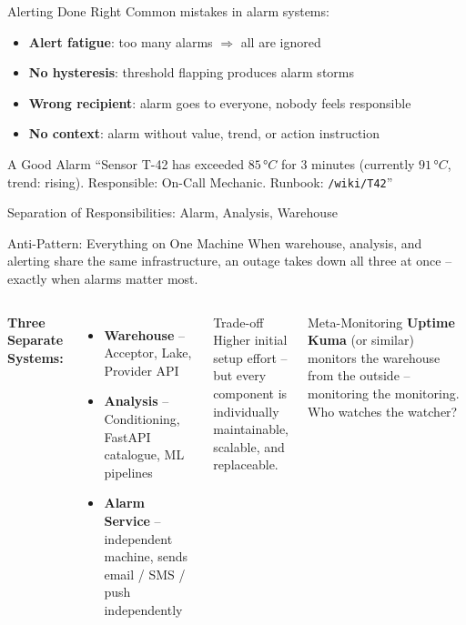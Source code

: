 \documentclass[aspectratio=169]{beamer}
\begin{document}
\begin{frame}{Alerting Done Right}
  Common mistakes in alarm systems:
  \begin{itemize}
    \item \textbf{Alert fatigue}: too many alarms $\Rightarrow$ all are ignored
    \item \textbf{No hysteresis}: threshold flapping produces alarm storms
    \item \textbf{Wrong recipient}: alarm goes to everyone, nobody feels responsible
    \item \textbf{No context}: alarm without value, trend, or action instruction
  \end{itemize}
  \vspace{0.5em}
  \begin{exampleblock}{A Good Alarm}
    ``Sensor T-42 has exceeded $85\,°C$ for 3 minutes (currently $91\,°C$,
    trend: rising). Responsible: On-Call Mechanic. Runbook: \texttt{/wiki/T42}''
  \end{exampleblock}
\end{frame}

\begin{frame}{Separation of Responsibilities: Alarm, Analysis, Warehouse}
  \begin{alertblock}{Anti-Pattern: Everything on One Machine}
    When warehouse, analysis, and alerting share the same infrastructure,
    an outage takes down all three at once – exactly when alarms matter most.
  \end{alertblock}
  \vspace{0.5em}
  \begin{columns}
      \textbf{Three Separate Systems:}
      \begin{itemize}
        \item \textbf{Warehouse} – Acceptor, Lake, Provider API
        \item \textbf{Analysis} – Conditioning, FastAPI catalogue,
              ML pipelines
        \item \textbf{Alarm Service} – independent machine,
              sends email / SMS / push independently
      \end{itemize}
      \begin{block}{Trade-off}
        Higher initial setup effort –\\
        but every component is individually\\
        maintainable, scalable, and replaceable.
      \end{block}
      \begin{exampleblock}{Meta-Monitoring}
        \textbf{Uptime Kuma} (or similar) monitors
        the warehouse from the outside –
        monitoring the monitoring.
        Who watches the watcher?
      \end{exampleblock}
  \end{columns}
\end{frame}
\end{document}
